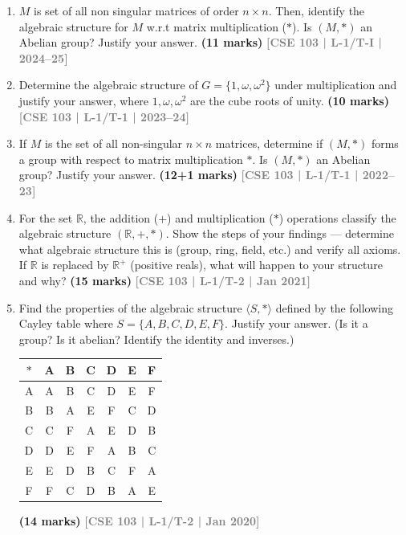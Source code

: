 \documentclass[12pt,a3paper]{article}
\newcommand{\yr}[1]{\hfill\textcolor{gray}{\small\textbf{[#1]}}}
\newcommand{\mk}[1]{\textcolor{orange!70!black}{\small\textbf{(#1 marks)}}}
\begin{document}
\begin{enumerate}


\item $M$ is set of all non singular matrices of order $n \times n$. Then, identify the algebraic structure for $M$ w.r.t matrix multiplication ($*$). Is $(M, *)$ an Abelian group? Justify your answer.
\mk{11} \yr{CSE 103 | L-1/T-I | 2024--25}

\item Determine the algebraic structure of $G = \{1, \omega, \omega^2\}$ under multiplication and justify your answer, where $1, \omega, \omega^2$ are the cube roots of unity.
\mk{10} \yr{CSE 103 | L-1/T-1 | 2023--24}

\item If $M$ is the set of all non-singular $n \times n$ matrices, determine if $(M, *)$ forms a group with respect to matrix multiplication $*$. Is $(M, *)$ an Abelian group? Justify your answer.
\mk{12+1} \yr{CSE 103 | L-1/T-1 | 2022--23}

\item For the set $\mathbb{R}$, the addition ($+$) and multiplication ($*$) operations classify the algebraic structure $(\mathbb{R}, +, *)$. Show the steps of your findings — determine what algebraic structure this is (group, ring, field, etc.) and verify all axioms. If $\mathbb{R}$ is replaced by $\mathbb{R}^+$ (positive reals), what will happen to your structure and why?
\mk{15} \yr{CSE 103 | L-1/T-2 | Jan 2021}  

\item Find the properties of the algebraic structure $\langle S, * \rangle$ defined by the following Cayley table where $S = \{A, B, C, D, E, F\}$. Justify your answer. (Is it a group? Is it abelian? Identify the identity and inverses.)
\begin{center}
\begin{tabular}{c|cccccc}
$*$ & A & B & C & D & E & F \\\hline
A & A & B & C & D & E & F \\
B & B & A & E & F & C & D \\
C & C & F & A & E & D & B \\
D & D & E & F & A & B & C \\
E & E & D & B & C & F & A \\
F & F & C & D & B & A & E \\
\end{tabular}
\end{center}
\mk{14} \yr{CSE 103 | L-1/T-2 | Jan 2020}


\end{enumerate}
\end{document}
